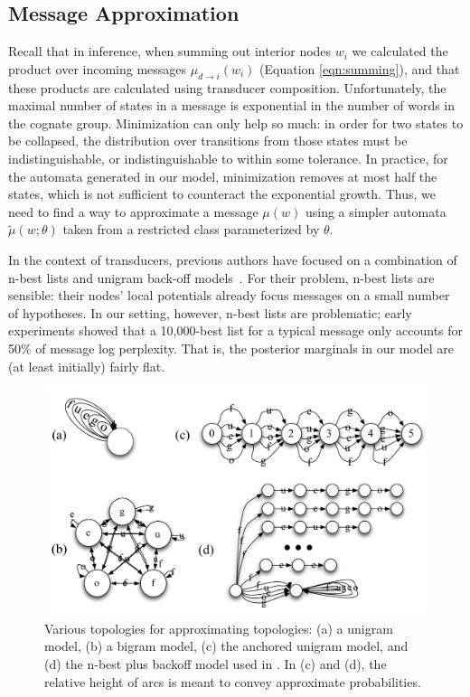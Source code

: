 \documentclass[11pt,a4paper]{article}
\begin{document}
\subsection{Message Approximation}
\label{sec:approx}

Recall that in inference, when summing out interior nodes $w_i$ we
calculated the product over incoming messages $\mu_{d\to i}(w_i)$
(Equation \ref{eqn:summing}), and that these products are calculated
using transducer composition. Unfortunately, the maximal number of
states in a message is exponential in the number of words in the
cognate group. Minimization can only help so much: in order for two
states to be collapsed, the distribution over transitions from those
states must be indistinguishable, or indistinguishable to within
some tolerance. In practice, for the automata generated in our
model, minimization removes at most half the states, which is not
sufficient to counteract the exponential growth. Thus, we need to
find a way to approximate a message $\mu(w)$ using a simpler automata
$\tilde\mu(w;\theta)$ taken from a restricted class parameterized
by $\theta$.

In the context of transducers, previous authors have focused on a
combination of n-best lists and unigram back-off
models~\cite{dreyer2009graphical}.  For their problem, n-best lists
are sensible: their nodes' local potentials already focus messages
on a small number of hypotheses.  In our setting, however, n-best
lists are problematic; early experiments showed that a 10,000-best
list for a typical message only accounts for 50\% of message log
perplexity. That is, the posterior marginals in our model are (at
least initially) fairly flat.

\begin{figure}
  \centering
  \includegraphics[scale=0.3]{fsa}
  \caption{Various topologies for approximating topologies: (a) a
  unigram model, (b) a bigram model, (c) the anchored unigram model,
  and (d) the n-best plus backoff model used in
  . In (c) and (d), the relative height
  of arcs is meant to convey approximate probabilities.}
  \label{fig:fsa}
\end{figure}
\end{document}

